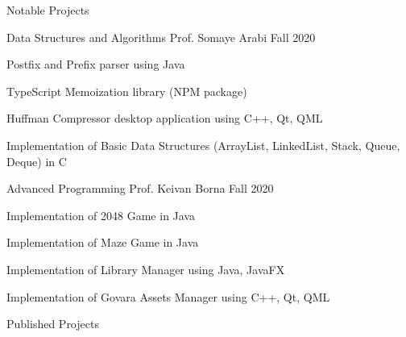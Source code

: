 \documentclass[]{main}
\begin{document}
\begin{section}{Notable Projects}
    \begin{subsection}{ Data Structures and Algorithms }{ Prof. Somaye Arabi }{ Fall 2020 }{  }
            \item Postfix and Prefix parser using Java \;\href{ https://github.com/ckoliber/XFixToYFix }{\faExternalLink*}
            \item TypeScript Memoization library (NPM package) \;\href{ https://github.com/ckoliber/memoizor }{\faExternalLink*}
            \item Huffman Compressor desktop application using C++, Qt, QML \;\href{ https://github.com/ckoliber/kuffman }{\faExternalLink*}
            \item Implementation of Basic Data Structures (ArrayList, LinkedList, Stack, Queue, Deque) in C \;\href{ https://github.com/ckoliber/kstd }{\faExternalLink*}
            \end{subsection}
    \begin{subsection}{ Advanced Programming }{ Prof. Keivan Borna }{ Fall 2020 }{  }
            \item Implementation of 2048 Game in Java \;\href{ https://github.com/ckoliber/2048 }{\faExternalLink*}
            \item Implementation of Maze Game in Java \;\href{ https://github.com/ckoliber/Maze }{\faExternalLink*}
            \item Implementation of Library Manager using Java, JavaFX \;\href{ https://github.com/ckoliber/LibraryManager }{\faExternalLink*}
            \item Implementation of Govara Assets Manager using C++, Qt, QML \;\href{ https://github.com/ckoliber/govara }{\faExternalLink*}
            \end{subsection}
    \end{section}

\begin{section}{Published Projects}
    \begin{subsection}{  }{  }{  }{  }
            \item  \;\href{  }{\faExternalLink*}
            \end{subsection}
    \end{section}

\end{document}
